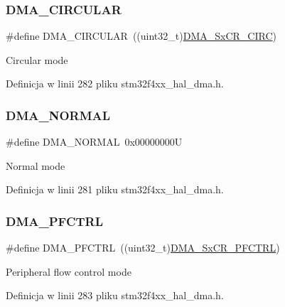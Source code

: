 \subsubsection{\texorpdfstring{D\+M\+A\+\_\+\+C\+I\+R\+C\+U\+L\+AR}{DMA\_CIRCULAR}}
{\footnotesize\ttfamily \#define D\+M\+A\+\_\+\+C\+I\+R\+C\+U\+L\+AR~((uint32\+\_\+t)\hyperlink{group___peripheral___registers___bits___definition_gadc248dbc519cc580621cdadcdd8741fb}{D\+M\+A\+\_\+\+Sx\+C\+R\+\_\+\+C\+I\+RC})}

Circular mode 

Definicja w linii 282 pliku stm32f4xx\+\_\+hal\+\_\+dma.\+h.

\mbox{\label{group___d_m_a__mode_ga04941acfbbdefc53e1e08133cffa3b8a}} 
\subsubsection{\texorpdfstring{D\+M\+A\+\_\+\+N\+O\+R\+M\+AL}{DMA\_NORMAL}}
{\footnotesize\ttfamily \#define D\+M\+A\+\_\+\+N\+O\+R\+M\+AL~0x00000000U}

Normal mode 

Definicja w linii 281 pliku stm32f4xx\+\_\+hal\+\_\+dma.\+h.

\mbox{\label{group___d_m_a__mode_ga7974ee645c8e275a2297cf37eec9e022}} 
\subsubsection{\texorpdfstring{D\+M\+A\+\_\+\+P\+F\+C\+T\+RL}{DMA\_PFCTRL}}
{\footnotesize\ttfamily \#define D\+M\+A\+\_\+\+P\+F\+C\+T\+RL~((uint32\+\_\+t)\hyperlink{group___peripheral___registers___bits___definition_ga11f412d256043bec3e01ceef7f2099f2}{D\+M\+A\+\_\+\+Sx\+C\+R\+\_\+\+P\+F\+C\+T\+RL})}

Peripheral flow control mode 

Definicja w linii 283 pliku stm32f4xx\+\_\+hal\+\_\+dma.\+h.

